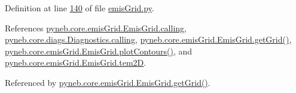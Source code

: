 Definition at line \hyperlink{emis_grid_8py_source_l00140}{140} of file \hyperlink{emis_grid_8py_source}{emis\-Grid.\-py}.



References \hyperlink{emis_grid_8py_source_l00044}{pyneb.\-core.\-emis\-Grid.\-Emis\-Grid.\-calling}, \hyperlink{diags_8py_source_l00169}{pyneb.\-core.\-diags.\-Diagnostics.\-calling}, \hyperlink{emis_grid_8py_source_l00114}{pyneb.\-core.\-emis\-Grid.\-Emis\-Grid.\-get\-Grid()}, \hyperlink{emis_grid_8py_source_l00182}{pyneb.\-core.\-emis\-Grid.\-Emis\-Grid.\-plot\-Contours()}, and \hyperlink{emis_grid_8py_source_l00091}{pyneb.\-core.\-emis\-Grid.\-Emis\-Grid.\-tem2\-D}.



Referenced by \hyperlink{emis_grid_8py_source_l00114}{pyneb.\-core.\-emis\-Grid.\-Emis\-Grid.\-get\-Grid()}.


